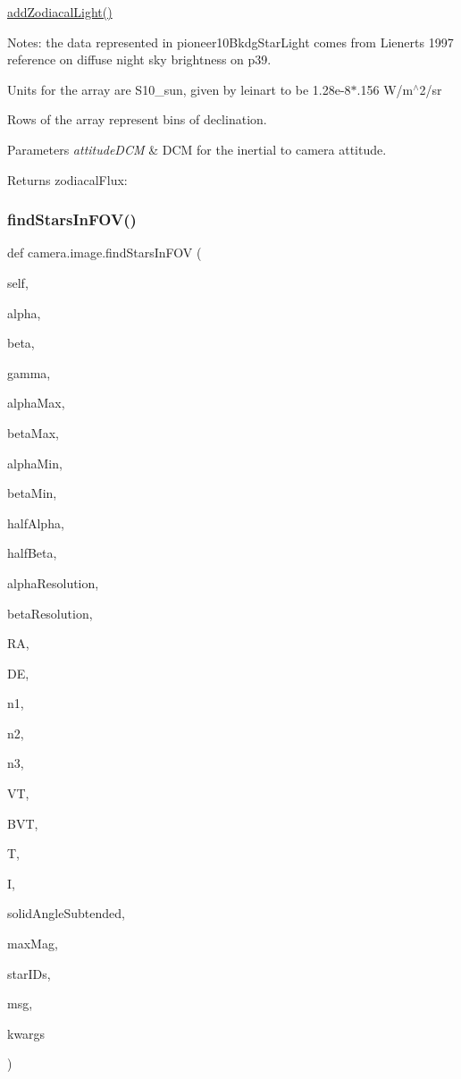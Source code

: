 \hyperlink{classcamera_1_1image_aa861ed59adf2eb74ef364fe1a5e3c6db}{add\+Zodiacal\+Light()} 

Notes\+: the data represented in pioneer10\+Bkdg\+Star\+Light comes from Lienert\textquotesingle{}s 1997 reference on diffuse night sky brightness on p39.

Units for the array are S10\+\_\+sun, given by leinart to be 1.\+28e-\/8$\ast$.156 W/m$^\wedge$2/sr

Rows of the array represent bins of declination. 
\begin{DoxyParams}{Parameters}
{\em attitude\+D\+CM} & D\+CM for the inertial to camera attitude. \\
\hline
\end{DoxyParams}
\begin{DoxyReturn}{Returns}
zodiacal\+Flux\+: 
\end{DoxyReturn}
\mbox{\label{classcamera_1_1image_a07f3ece0789fb705f57985642b41ae47}} 
\subsubsection{\texorpdfstring{find\+Stars\+In\+F\+O\+V()}{findStarsInFOV()}}
{\footnotesize\ttfamily def camera.\+image.\+find\+Stars\+In\+F\+OV (\begin{DoxyParamCaption}\item[{}]{self,  }\item[{}]{alpha,  }\item[{}]{beta,  }\item[{}]{gamma,  }\item[{}]{alpha\+Max,  }\item[{}]{beta\+Max,  }\item[{}]{alpha\+Min,  }\item[{}]{beta\+Min,  }\item[{}]{half\+Alpha,  }\item[{}]{half\+Beta,  }\item[{}]{alpha\+Resolution,  }\item[{}]{beta\+Resolution,  }\item[{}]{RA,  }\item[{}]{DE,  }\item[{}]{n1,  }\item[{}]{n2,  }\item[{}]{n3,  }\item[{}]{VT,  }\item[{}]{B\+VT,  }\item[{}]{T,  }\item[{}]{I,  }\item[{}]{solid\+Angle\+Subtended,  }\item[{}]{max\+Mag,  }\item[{}]{star\+I\+Ds,  }\item[{}]{msg,  }\item[{}]{kwargs }\end{DoxyParamCaption})}



